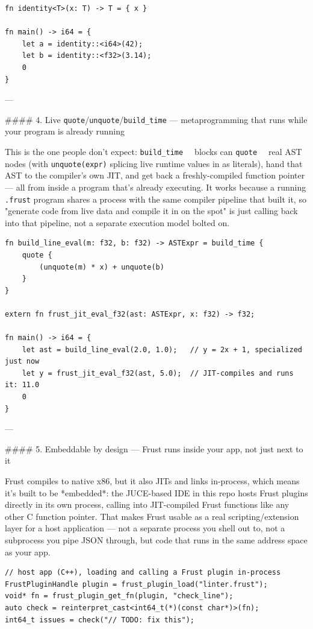 \documentclass{book}
\begin{document}
\begin{lstlisting}
fn identity<T>(x: T) -> T = { x }

fn main() -> i64 = {
    let a = identity::<i64>(42);
    let b = identity::<f32>(3.14);
    0
}
\end{lstlisting}

---

#### 4. Live \texttt{quote}/\texttt{unquote}/\texttt{build_time} — metaprogramming that runs while your program is already running

This is the one people don't expect: \texttt{build_time { }} blocks can \texttt{quote { }} real AST
nodes (with \texttt{unquote(expr)} splicing live runtime values in as literals), hand that
AST to the compiler's own JIT, and get back a freshly-compiled function pointer — all
from inside a program that's already executing. It works because a running \texttt{.frust}
program shares a process with the same compiler pipeline that built it, so "generate
code from live data and compile it in on the spot" is just calling back into that
pipeline, not a separate execution model bolted on.

\begin{lstlisting}
fn build_line_eval(m: f32, b: f32) -> ASTExpr = build_time {
    quote {
        (unquote(m) * x) + unquote(b)
    }
}

extern fn frust_jit_eval_f32(ast: ASTExpr, x: f32) -> f32;

fn main() -> i64 = {
    let ast = build_line_eval(2.0, 1.0);   // y = 2x + 1, specialized just now
    let y = frust_jit_eval_f32(ast, 5.0);  // JIT-compiles and runs it: 11.0
    0
}
\end{lstlisting}

---

#### 5. Embeddable by design — Frust runs inside your app, not just next to it

Frust compiles to native x86, but it also JITs and links in-process, which means it's
built to be *embedded*: the JUCE-based IDE in this repo hosts Frust plugins directly
in its own process, calling into JIT-compiled Frust functions like any other C
function pointer. That makes Frust usable as a real scripting/extension layer for a
host application — not a separate process you shell out to, not a subprocess you pipe
JSON through, but code that runs in the same address space as your app.

\begin{lstlisting}
// host app (C++), loading and calling a Frust plugin in-process
FrustPluginHandle plugin = frust_plugin_load("linter.frust");
void* fn = frust_plugin_get_fn(plugin, "check_line");
auto check = reinterpret_cast<int64_t(*)(const char*)>(fn);
int64_t issues = check("// TODO: fix this");
\end{lstlisting}
\end{document}
